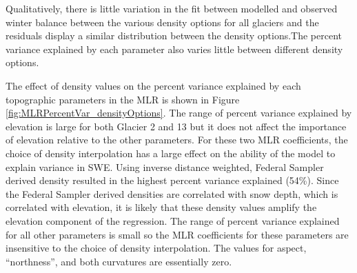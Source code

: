 \documentclass[12pt]{article}
\begin{document}
Qualitatively, there is little variation in the fit between modelled and observed winter balance between the various density options for all glaciers and the residuals display a similar distribution between the density options.The percent variance explained by each parameter also varies little between different density options. 

The effect of density values on the percent variance explained by each topographic parameters in the MLR is shown in Figure \ref{fig:MLRPercentVar_densityOptions}. The range of percent variance explained by elevation is large for both Glacier 2 and 13 but it does not affect the importance of elevation relative to the other parameters. For these two MLR coefficients, the choice of density interpolation has a large effect on the ability of the model to explain variance in SWE. Using inverse distance weighted, Federal Sampler derived density resulted in the highest percent variance explained (54\%). Since the Federal Sampler derived densities are correlated with snow depth, which is correlated with elevation, it is likely that these density values amplify the elevation component of the regression. The range of percent variance explained for all other parameters is small so the MLR coefficients for these parameters are insensitive to the choice of density interpolation. The values for aspect, ``northness'', and both curvatures are essentially zero. 
\end{document}
